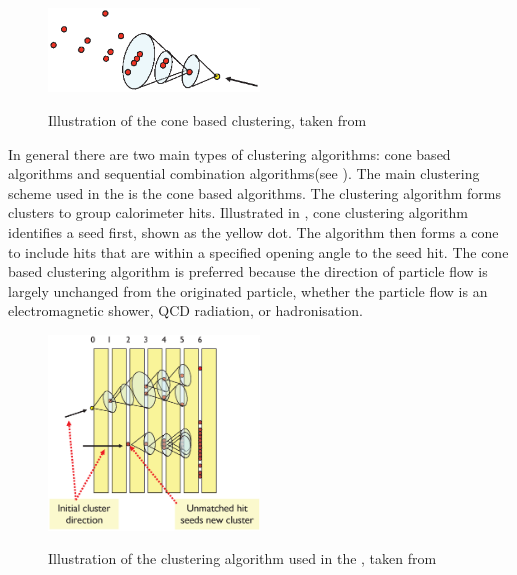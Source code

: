 \begin{figure}[tbph]
\centering
{\includegraphics[width=0.5\textwidth]{pandora/coneClustering}}%
\caption{Illustration of the cone based clustering, taken from \cite{Marshall:pandoraLC}}
\label{fig:pandoraConeClustering}
\end{figure}

In general there are two main types of clustering algorithms: cone based algorithms and sequential combination algorithms(see ). The main clustering scheme used in the  \pandora is the cone based algorithms. The clustering algorithm forms clusters to group calorimeter hits. Illustrated in , cone clustering algorithm identifies a seed first, shown as the yellow dot. The algorithm then forms a cone to include hits that are within a specified opening angle to the seed hit. The cone based clustering algorithm is preferred because the direction of particle flow is largely unchanged from the originated particle, whether the particle flow is an electromagnetic shower, QCD radiation, or hadronisation.


\begin{figure}[tbph]
\centering
{\includegraphics[width=0.5\textwidth]{pandora/coneClustering2}}%
\caption{Illustration of the clustering algorithm used  in the \pandora, taken from \cite{Marshall:pandoraLC}}
\label{fig:pandoraConeClustering2}
\end{figure}

